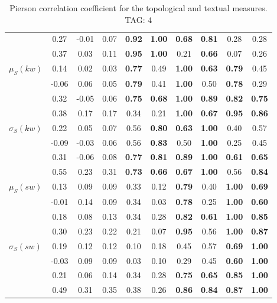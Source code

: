 \begin{table*}[h!]
\begin{center}
\begin{tabular}{| l || c | c | c | c | c | c | c | c | c |}
 & 0.27 & -0.01 & 0.07 & {\bf 0.92} & {\bf 1.00} & {\bf 0.68} & {\bf 0.81} & 0.28 & 0.28 \\
 & 0.37 & 0.03 & 0.11 & {\bf 0.95} & {\bf 1.00} & 0.21 & {\bf 0.66} & 0.07 & 0.26 \\\hline
$\mu_S(kw)$ & 0.14 & 0.02 & 0.03 & {\bf 0.77} & 0.49 & {\bf 1.00} & {\bf 0.63} & {\bf 0.79} & 0.45 \\
 & -0.06 & 0.06 & 0.05 & {\bf 0.79} & 0.41 & {\bf 1.00} & 0.50 & {\bf 0.78} & 0.29 \\
 & 0.32 & -0.05 & 0.06 & {\bf 0.75} & {\bf 0.68} & {\bf 1.00} & {\bf 0.89} & {\bf 0.82} & {\bf 0.75} \\
 & 0.38 & 0.17 & 0.17 & 0.34 & 0.21 & {\bf 1.00} & {\bf 0.67} & {\bf 0.95} & {\bf 0.86} \\\hline
$\sigma_S(kw)$ & 0.22 & 0.05 & 0.07 & 0.56 & {\bf 0.80} & {\bf 0.63} & {\bf 1.00} & 0.40 & 0.57 \\
 & -0.09 & -0.03 & 0.06 & 0.56 & {\bf 0.83} & 0.50 & {\bf 1.00} & 0.25 & 0.45 \\
 & 0.31 & -0.06 & 0.08 & {\bf 0.77} & {\bf 0.81} & {\bf 0.89} & {\bf 1.00} & {\bf 0.61} & {\bf 0.65} \\
 & 0.55 & 0.23 & 0.31 & {\bf 0.73} & {\bf 0.66} & {\bf 0.67} & {\bf 1.00} & 0.56 & {\bf 0.84} \\\hline
$\mu_S(sw)$ & 0.13 & 0.09 & 0.09 & 0.33 & 0.12 & {\bf 0.79} & 0.40 & {\bf 1.00} & {\bf 0.69} \\
 & -0.01 & 0.14 & 0.09 & 0.34 & 0.03 & {\bf 0.78} & 0.25 & {\bf 1.00} & {\bf 0.60} \\
 & 0.18 & 0.08 & 0.13 & 0.34 & 0.28 & {\bf 0.82} & {\bf 0.61} & {\bf 1.00} & {\bf 0.85} \\
 & 0.30 & 0.23 & 0.22 & 0.21 & 0.07 & {\bf 0.95} & 0.56 & {\bf 1.00} & {\bf 0.87} \\\hline
$\sigma_S(sw)$ & 0.19 & 0.12 & 0.12 & 0.10 & 0.18 & 0.45 & 0.57 & {\bf 0.69} & {\bf 1.00} \\
 & -0.03 & 0.09 & 0.09 & 0.03 & 0.10 & 0.29 & 0.45 & {\bf 0.60} & {\bf 1.00} \\
 & 0.21 & 0.06 & 0.14 & 0.34 & 0.28 & {\bf 0.75} & {\bf 0.65} & {\bf 0.85} & {\bf 1.00} \\
 & 0.49 & 0.31 & 0.35 & 0.38 & 0.26 & {\bf 0.86} & {\bf 0.84} & {\bf 0.87} & {\bf 1.00} \\\hline
\end{tabular}
\caption{Pierson correlation coefficient for the topological and textual measures. TAG: 4}
\end{center}
\end{table*}